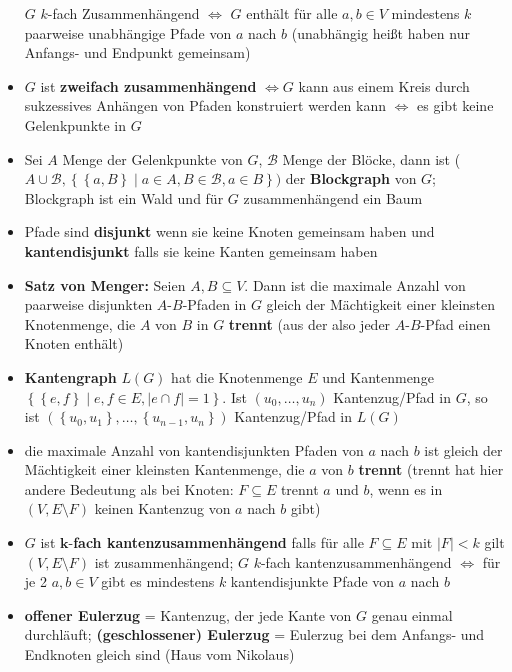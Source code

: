 \documentclass[10pt,a4paper]{article}
\begin{document}
\begin{itemize}
$G$ $k$-fach Zusammenhängend $\Leftrightarrow$ $G$ enthält für alle $a,b\in V$ mindestens $k$ paarweise unabhängige Pfade von $a$ nach $b$ (unabhängig heißt haben nur Anfangs- und Endpunkt gemeinsam)
\item $G$ ist \textbf{zweifach zusammenhängend}  $\Leftrightarrow G$ kann aus einem Kreis durch sukzessives Anhängen von Pfaden konstruiert werden kann $\Leftrightarrow$ es gibt keine Gelenkpunkte in $G$ 
\item Sei $A$ Menge der Gelenkpunkte von $G$, $\mathcal{B}$ Menge der Blöcke, dann ist ($A\cup \mathcal{B}, \left\lbrace \left\lbrace a, B\right\rbrace \mid a\in A, B\in \mathcal{B}, a\in B\right\rbrace)$ der \textbf{Blockgraph} von $G$; Blockgraph ist ein Wald und  für $G$ zusammenhängend ein Baum
\item Pfade sind \textbf{disjunkt} wenn sie keine Knoten gemeinsam haben und \textbf{kantendisjunkt} falls sie keine Kanten gemeinsam haben
\item \textbf{Satz von Menger:} Seien $A,B\subseteq V$. Dann ist die maximale Anzahl von paarweise disjunkten $A$-$B$-Pfaden in $G$ gleich der Mächtigkeit einer kleinsten Knotenmenge, die $A$ von $B$ in $G$ \textbf{trennt} (aus der also jeder $A$-$B$-Pfad einen Knoten enthält)
\item \textbf{Kantengraph} $L(G)$ hat die Knotenmenge $E$ und Kantenmenge $\left\lbrace \left\lbrace e,f \right\rbrace \mid e,f \in E, \vert e \cap f\vert =1\right\rbrace$. Ist $(u_{0},\dotsc, u_{n})$ Kantenzug/Pfad in $G$, so ist $(\left\lbrace  u_{0},u_{1}\right\rbrace,\dotsc, \left\lbrace u_{n-1},u_{n}\right\rbrace)$ Kantenzug/Pfad in $L(G)$
\item die maximale Anzahl von kantendisjunkten Pfaden von $a$ nach $b$ ist gleich der Mächtigkeit einer kleinsten Kantenmenge, die $a$ von $b$ \textbf{trennt} (trennt hat hier andere Bedeutung als bei Knoten: $F\subseteq E$ trennt $a$ und $b$, wenn es in $(V, E\setminus F)$ keinen Kantenzug von $a$ nach $b$ gibt)
\item $G$ ist $\boldsymbol{k}$-\textbf{fach kantenzusammenhängend} falls für alle $F \subseteq E$ mit $\vert F \vert <k$ gilt $(V,E\setminus F)$ ist zusammenhängend;
$G$ $k$-fach kantenzusammenhängend $\Leftrightarrow$ für je 2 $a,b\in V$ gibt es mindestens $k$ kantendisjunkte Pfade von $a$ nach $b$
\item \textbf{offener Eulerzug} = Kantenzug, der jede Kante von $G$ genau einmal durchläuft; \textbf{(geschlossener) Eulerzug} = Eulerzug bei dem Anfangs- und Endknoten gleich sind (Haus vom Nikolaus)

\end{itemize}
\end{document}

